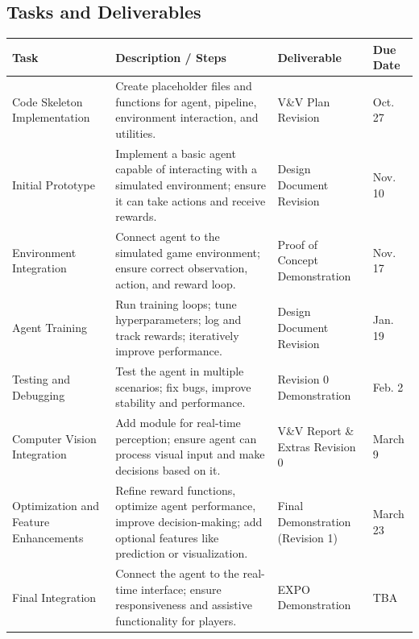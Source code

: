\documentclass{article}
\begin{document}
\subsection{Tasks and Deliverables}\label{subsec:tasks}
\begin{table}[htbp]
\centering
\begin{tabular}{|p{3cm}|p{5cm}|p{3cm}|p{2cm}|}
\hline
\textbf{Task} & \textbf{Description / Steps} & \textbf{Deliverable} & \textbf{Due Date} \\ \hline

Code Skeleton Implementation & Create placeholder files and functions for \RL{} agent, \CV{} pipeline, environment interaction, and utilities. & V\&V Plan Revision & Oct. 27 \\ \hline

Initial \RL{} Prototype & Implement a basic \RL{} agent capable of interacting with a simulated environment; ensure it can take actions and receive rewards. & Design Document Revision & Nov. 10 \\ \hline

Environment Integration & Connect \RL{} agent to the simulated game environment; ensure correct observation, action, and reward loop. & Proof of Concept Demonstration & Nov. 17 \\ \hline

Agent Training & Run \RL{} training loops; tune hyperparameters; log and track rewards; iteratively improve performance. & Design Document Revision & Jan. 19 \\ \hline

Testing and Debugging & Test the \RL{} agent in multiple scenarios; fix bugs, improve stability and performance. & Revision 0 Demonstration & Feb. 2 \\ \hline

Computer Vision Integration & Add \CV{} module for real-time perception; ensure agent can process visual input and make decisions based on it. & V\&V Report \& Extras Revision 0 & March 9 \\ \hline

Optimization and Feature Enhancements & Refine reward functions, optimize agent performance, improve decision-making; add optional features like prediction or visualization. & Final Demonstration (Revision 1) & March 23 \\ \hline

Final Integration & Connect the agent to the real-time interface; ensure responsiveness and assistive functionality for players. & EXPO Demonstration & TBA \\ \hline


\end{tabular}
\end{table}
\end{document}
